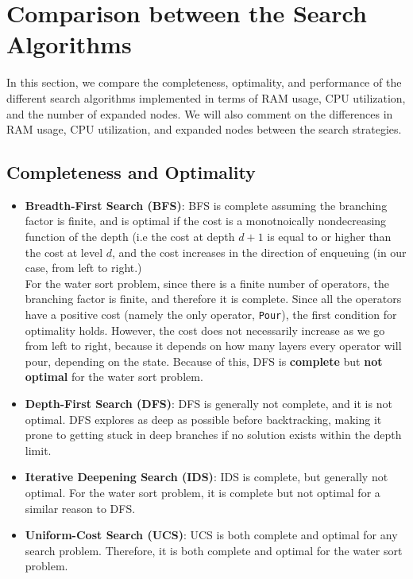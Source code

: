 \documentclass{article}
\begin{document}
\newpage

\section{Comparison between the Search Algorithms}

In this section, we compare the completeness, optimality, and performance of the different search algorithms implemented in terms of RAM usage, CPU utilization, and the number of expanded nodes. We will also comment on the differences in RAM usage, CPU utilization, and expanded nodes between the search strategies.

\subsection{Completeness and Optimality}
\begin{itemize}
    \item \textbf{Breadth-First Search (BFS)}: BFS is complete assuming the branching factor is finite, and is optimal if the cost is a monotnoically nondecreasing function of the depth (i.e the cost at depth $d+1$ is equal to or higher than the cost at level $d$, and the cost increases in the direction of enqueuing (in our case, from left to right.) \\
    
    For the water sort problem, since there is a finite number of operators, the branching factor is finite, and therefore it is complete. Since all the operators have a positive cost (namely the only operator, \texttt{Pour}), the first condition for optimality holds. However, the cost does not necessarily increase as we go from left to right, because it depends on how many layers every operator will pour, depending on the state. Because of this, DFS is \textbf{complete} but \textbf{not optimal} for the water sort problem.

    \item \textbf{Depth-First Search (DFS)}: DFS is generally not complete, and it is not optimal. DFS explores as deep as possible before backtracking, making it prone to getting stuck in deep branches if no solution exists within the depth limit.

    \item \textbf{Iterative Deepening Search (IDS)}: IDS is complete, but generally not optimal. For the water sort problem, it is complete but not optimal for a similar reason to DFS.

    \item \textbf{Uniform-Cost Search (UCS)}: UCS is both complete and optimal for any search problem. Therefore, it is both complete and optimal for the water sort problem.


\end{itemize}
\end{document}
